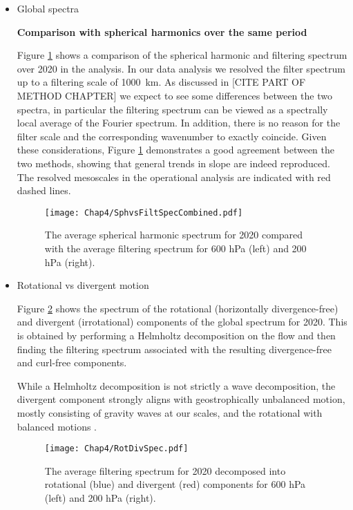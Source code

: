 \begin{itemize}
\item{Global spectra}

\textbf{Comparison with spherical harmonics over the same period}

Figure \ref{fig:ch4:SphvsFiltSpec} shows a comparison of the spherical harmonic and filtering spectrum over 2020 in the analysis. In our data analysis we resolved the filter spectrum up to a filtering scale of 1000~km. As discussed in [CITE PART OF METHOD CHAPTER] we expect to see some differences between the two spectra, in particular the filtering spectrum can be viewed as a spectrally local average of the Fourier spectrum. In addition, there is no reason for the filter scale and the corresponding wavenumber to exactly coincide. Given these considerations, Figure \ref{fig:ch4:SphvsFiltSpec} demonstrates a good agreement between the two methods, showing that general trends in slope are indeed reproduced. The resolved mesoscales in the operational analysis are indicated with red dashed lines.  

\begin{figure}[htb]
    \centering
    \texttt{[image: Chap4/SphvsFiltSpecCombined.pdf]}
    \caption[A comparison of the spherical harmonic spectrum and the filtering spectrum.]
    {
        The average spherical harmonic spectrum for 2020 compared with the average filtering spectrum for 600 hPa (left) and 200 hPa (right). 
        \label{fig:ch4:SphvsFiltSpec}
    }
\end{figure}

\item{Rotational vs divergent motion}

Figure \ref{fig:ch4:RotDivSpec} shows the spectrum of the rotational (horizontally divergence-free) and divergent (irrotational) components of the global spectrum for 2020. This is obtained by performing a Helmholtz decomposition on the flow and then finding the filtering spectrum associated with the resulting divergence-free and curl-free components.

While a Helmholtz decomposition is not strictly a wave decomposition, the divergent component strongly aligns with geostrophically unbalanced motion, mostly consisting of gravity waves at our scales, and the rotational with balanced motions \cite{morfa_avalos_2024,waite2020untangling}. 

\begin{figure}[htb]
    \centering
    \texttt{[image: Chap4/RotDivSpec.pdf]}
    \caption[Rotational and divergent components of the global filtering spectrum.]
    {
        The average filtering spectrum for 2020 decomposed into rotational (blue) and divergent (red) components for 600 hPa (left) and 200 hPa (right). 
        \label{fig:ch4:RotDivSpec}
    }
\end{figure}


\end{itemize}
